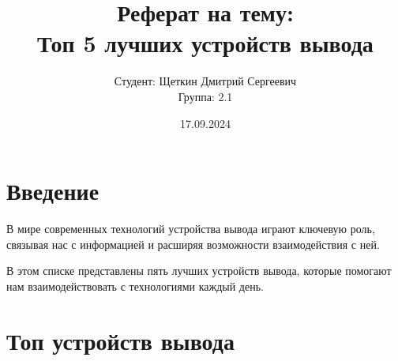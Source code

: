 \documentclass[14pt]{extreport}
\begin{document}
    \title{Реферат на тему: \\[0.5cm] \textbf{Топ 5 лучших устройств вывода}}
    \author{Студент: Щеткин Дмитрий Сергеевич \\ Группа: 2.1}
    \date{17.09.2024}

    \maketitle
    
    \tableofcontents
    
    \chapter{Введение}
    В мире современных технологий устройства вывода играют ключевую роль, связывая нас с информацией и расширяя возможности взаимодействия с ней. 
    
    В этом списке представлены пять лучших устройств вывода, которые помогают нам взаимодействовать с технологиями каждый день. 
    
    \chapter{Топ устройств вывода}
\end{document}
